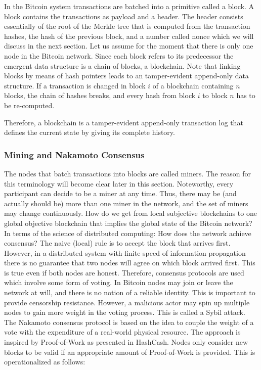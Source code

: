 In the Bitcoin system transactions are batched into a primitive called a block. A block contains the transactions as payload and a header. The header consists essentially of the root of the Merkle tree that is computed from the transaction hashes, the hash of the previous block, and a number called nonce which we will discuss in the next section. Let us assume for the moment that there is only one node in the Bitcoin network. Since each block refers to its predecessor the emergent data structure is a chain of blocks, a blockchain. Note that linking blocks by means of hash pointers leads to an tamper-evident append-only data structure. If a transaction is changed in block $i$ of a blockchain containing $n$ blocks, the chain of hashes breaks, and every hash from block $i$ to block $n$ has to be re-computed.

Therefore, a blockchain is a tamper-evident append-only transaction log that defines the current state by giving its complete history.

\subsubsection{Mining and Nakamoto Consensus}
\label{sec:mining}

The nodes that batch transactions into blocks are called miners. The reason for this terminology will become clear later in this section. Noteworthy, every participant can decide to be a miner at any time. Thus, there may be (and actually should be) more than one miner in the network, and the set of miners may change continuously. How do we get from local subjective blockchains to one global objective blockchain that implies the global state of the Bitcoin network? In terms of the science of distributed computing: How does the network achieve consensus?
The naive (local) rule is to accept the block that arrives first. However, in a distributed system with finite speed of information propagation there is no guarantee that two nodes will agree on which block arrived first. This is true even if both nodes are honest. Therefore, consensus protocols are used which involve some form of voting. In Bitcoin nodes may join or leave the network at will, and there is no notion of a reliable identity. This is important to provide censorship resistance. However, a malicious actor may spin up multiple nodes to gain more weight in the voting process. This is called a Sybil attack. The Nakamoto consensus protocol is based on the idea to couple the weight of a vote with the expenditure of a real-world physical resource. The approach is inspired by Proof-of-Work as presented in HashCash. Nodes only consider new blocks to be valid if an appropriate amount of Proof-of-Work is provided. This is operationalized as follows:


